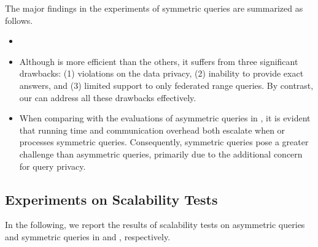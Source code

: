 The major findings in the experiments of symmetric queries are summarized as follows.
\begin{itemize}
    \item {}

    \item Although \ICDE is more efficient than the others, it suffers from three significant drawbacks:
    (1) violations on the data privacy,
    (2) inability to provide exact answers,
    and (3) limited support to only federated range queries.
    By contrast, our \sysname can address all these drawbacks effectively.
    
    \item When comparing with the evaluations of asymmetric queries in , it is evident that running time and communication overhead both escalate when \sysname or \conclave processes symmetric queries.
    Consequently, symmetric queries pose a greater challenge than asymmetric queries, primarily due to the additional concern for query privacy.
\end{itemize}


\subsection{Experiments on Scalability Tests}
\label{subsec:exp-scalability}

In the following, we report the results of scalability tests on asymmetric queries and symmetric queries in  and , respectively.

